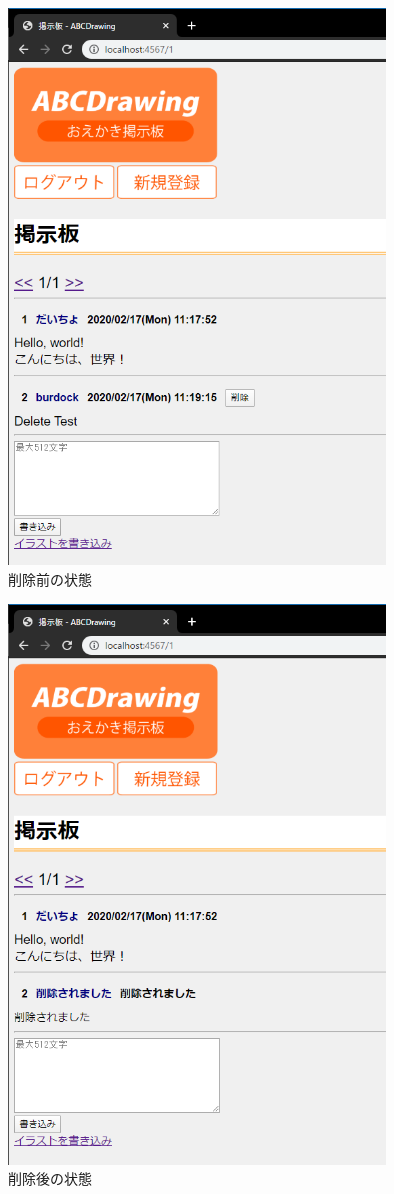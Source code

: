 \documentclass[a4j,titlepage]{jsarticle}
\begin{document}
\begin{figure}[H]
  \centering
  \includegraphics[width=10cm]{bbs04.png}
  \caption{削除前の状態}
  \label{f0}
\end{figure}

\begin{figure}[H]
  \centering
  \includegraphics[width=10cm]{bbs05.png}
  \caption{削除後の状態}
  \label{del}
\end{figure}
\end{document}
